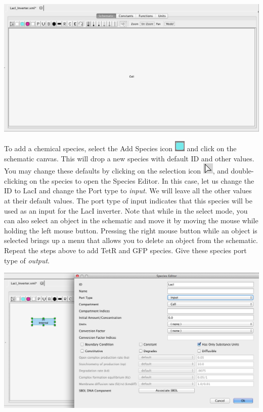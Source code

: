 \documentclass[titlepage,11pt]{article}
\begin{document}
\begin{center}
\includegraphics[width=160mm]{screenshots/schematicGT}
\end{center}

To add a chemical species, select the Add Species icon \includegraphics{../gui/icons/modelview/add_species_selected} and click on the schematic canvas.  This will drop a new species with default ID and other values.  You may change these defaults by clicking on the selection icon 
\includegraphics{../gui/icons/modelview/select_mode_selected}, and
double-clicking on the species to open the Species Editor.  In this case, let us change the ID to LacI and change the Port type to \emph{input}.  We will leave all the other values at their default values.  The port type of input indicates that this species will be used as an input for the LacI inverter.   
Note that while in the select mode, you can also select an object in the schematic and move it by moving the mouse while holding the left mouse button.  Pressing the right mouse button while an object is selected brings up a menu that allows you to delete an object from the schematic.  Repeat the steps above to add TetR and GFP species.  Give these species port type of \emph{output}. 

\begin{center}
\includegraphics[width=160mm]{screenshots/speciesGT}
\end{center}
\end{document}
